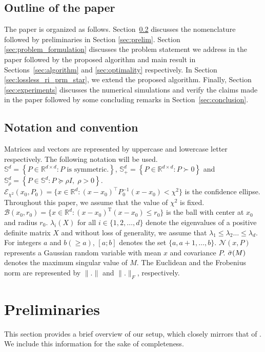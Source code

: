 \documentclass[Afour,sageh,times]{sagej}
\begin{document}
\subsection{Outline of the paper}
The paper is organized as follows. Section~\ref{sec:notation} discusses the nomenclature followed by preliminaries in Section \ref{sec:prelim}. Section \ref{sec:problem_formulation} discusses the problem statement we address in the paper followed by the proposed algorithm and main result in Sections~\ref{sec:algorithm} and \ref{sec:optimality} respectively. In Section \ref{sec:lossless_ri_prm_star}, we extend the proposed algorithm. Finally, Section \ref{sec:experiments} discusses the numerical simulations and verify the claims made in the paper followed by some concluding remarks in Section~\ref{sec:conclusion}.

\subsection{Notation and convention} \label{sec:notation}
Matrices and vectors are represented by uppercase and lowercase letter respectively. The following notation will be used. $\mathbb{S}^d=\left\{P\in\mathbb{R}^{d \times d}: P \text{ is symmetric.} \right\}$, $\mathbb{S}_{+}^d=\left\{P\in\mathbb{R}^{d \times d}: P\succ 0 \right\}$ and $\mathbb{S}_\rho^d=\left\{P\in\mathbb{S}^d: P\succeq \rho I,\;\rho>0 \right\}$. $\mathcal{E}_{\chi^2}(x_0, P_0)=\{x\in \mathbb{R}^d: (x-x_0)^\top P_0^{-1}(x-x_0)< \chi^2 \}$ is the confidence ellipse. Throughout this paper, we assume that the value of $\chi^2$ is fixed. $\mathcal{B}(x_0,r_0)=\{x\in\mathbb{R}^d:(x-x_0)^\mathrm{T}(x-x_0)\leq r_0\}$ is the ball with center at $x_0$ and radius $r_0$. $\lambda_i(X)$ for all $i\in\{1,2,\dots, d\}$ denote the eigenvalues of a positive definite matrix $X$ and without loss of generality, we assume that $\lambda_1\leq \lambda_2\dots\leq\lambda_d$. For integers $a$ and $b(\geq a)$, $[a;b]$ denotes the set $\{a,a+1,\dots,b\}$. $\mathcal{N}(x,P)$ represents a Gaussian random variable with mean $x$ and covariance $P$. $\Bar{\sigma}(M)$ denotes the maximum singular value of $M$. The Euclidean and the Frobenius norm are represented by $\|.\|$ and $\|.\|_F$, respectively. 
\section{Preliminaries\label{sec:prelim}}
This section provides a brief overview of our setup, which closely mirrors that of \cite{pedram2021gaussian}. We include this information for the sake of completeness.
\end{document}
